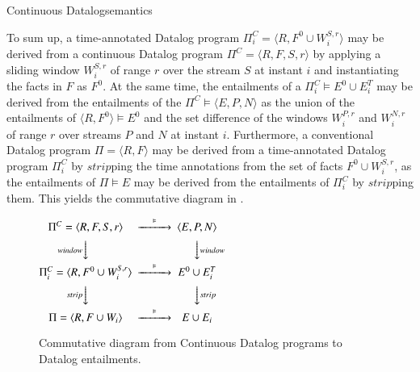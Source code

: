 \begin{nestedsection}{Continuous Datalog}{semantics}



To sum up, a time-annotated Datalog program
${\Pi^C_i = \langle R, F^0 \cup W^{S,r}_i \rangle}$ may be derived from
a continuous Datalog program ${\Pi^C = \langle R, F, S, r \rangle}$ by
applying a sliding window $W^{S,r}_i$ of range $r$ over the stream $S$ at
instant $i$ and instantiating the facts in $F$ as $F^0$. At the same time,
the entailments of a ${\Pi^C_i \vDash E^0 \cup E^T_i}$ may be derived from
the entailments of the ${\Pi^C \vDash \langle E, P, N \rangle}$ as the union
of the entailments of ${\langle R, F^0 \rangle \vDash E^0}$ and the set
difference of the windows $W^{P,r}_i$ and $W^{N,r}_i$ of range $r$ over
streams $P$ and $N$ at instant $i$.
Furthermore, a conventional Datalog program ${\Pi = \langle R, F \rangle}$
may be derived from a time-annotated Datalog program $\Pi^C_i$ by
${strip}$ping the time annotations from the set of facts
${F^0 \cup W^{S,r}_i}$, as the entailments of ${\Pi \vDash E}$ may be
derived from the entailments of $\Pi^C_i$ by $strip$ping them.
This yields the commutative diagram in .
\begin{figure}
\centering
$
\begin{CD}
	{\Pi^C = \langle R, F, S, r \rangle} @>\vDash>> {\langle E, P, N \rangle} \\
	@V{window}VV @VV{window}V \\
	{\Pi^C_i = \langle R, F^0 \cup W^{S,r}_i \rangle} @>\vDash>> {E^0 \cup E^T_i} \\
	@V{strip}VV @VV{strip}V \\
	{\Pi = \langle R, F \cup W_i \rangle} @>\vDash>> {E \cup E_i}
\end{CD}
$
\caption{Commutative diagram from Continuous Datalog programs to Datalog entailments.}
\end{figure}
\end{nestedsection}
